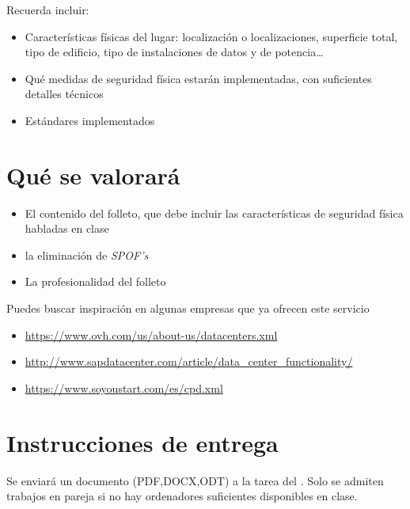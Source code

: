 Recuerda incluir:
\begin{itemize}
\item Características físicas del lugar: localización o localizaciones, superficie total, tipo de edificio, tipo de instalaciones de datos y de potencia…
\item Qué medidas de seguridad física estarán implementadas, con suficientes detalles técnicos
\item Estándares implementados
\end{itemize}

\section{Qué se valorará}
\begin{itemize}
\item El contenido del folleto, que debe incluir las características de seguridad física habladas en clase
\item la eliminación de \textit{SPOF's}
\item La profesionalidad del folleto
\end{itemize}

Puedes buscar inspiración en algunas empresas que ya ofrecen este servicio
\begin{itemize}
\item \url{https://www.ovh.com/us/about-us/datacenters.xml}
\item \url{http://www.sapdatacenter.com/article/data_center_functionality/}
\item \url{https://www.soyoustart.com/es/cpd.xml}
\end{itemize}

\section{Instrucciones de entrega}
Se enviará un documento (PDF,DOCX,ODT) a la tarea del . Solo se admiten trabajos en pareja si no hay ordenadores suficientes disponibles en clase.









